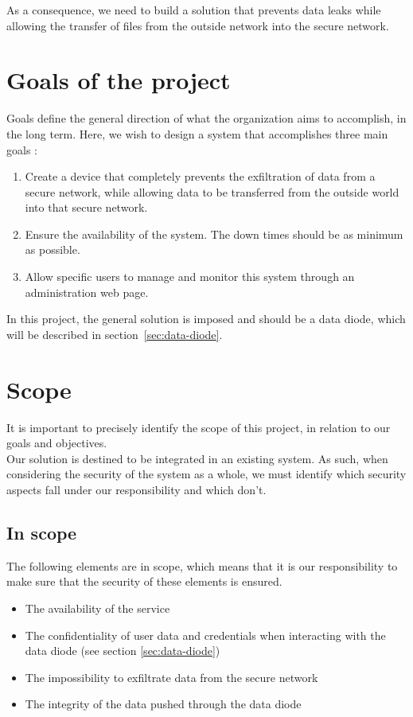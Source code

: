 \documentclass[a4paper,11pt]{article}
\begin{document}
As a consequence, we need to build a solution that prevents data leaks while allowing the transfer of files from the outside network into the secure network.

\section{Goals of the project}
\label{sec:goals}
Goals define the general direction of what the organization aims to accomplish, in the long term. Here, we wish to design a system that accomplishes three main goals :

\begin{enumerate}
\item{Create a device that completely prevents the exfiltration of data from a secure network, while allowing data to be transferred from the outside world into that secure network.}
\item{Ensure the availability of the system. The down times should be as minimum as possible.}
\item{Allow specific users to manage and monitor this system through an administration web page.}
\end{enumerate}

In this project, the general solution is imposed and should be a data diode, which will be described in section~\ref{sec:data-diode}.

\section{Scope}
It is important to precisely identify the scope of this project, in relation to our goals and objectives.\\

Our solution is destined to be integrated in an existing system. As such, when considering the security of the system as a whole, we must identify which security aspects fall under our responsibility and which don't. 

\subsection{In scope}
The following elements are in scope, which means that it is our responsibility to make sure that the security of these elements is ensured.

\begin{itemize}
\item{The availability of the service}
\item{The confidentiality of user data and credentials when interacting with the data diode (see section \ref{sec:data-diode})}
\item{The impossibility to exfiltrate data from the secure network}
\item{The integrity of the data pushed through the data diode}
\end{itemize}
\end{document}
